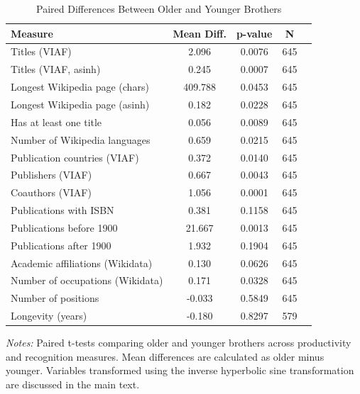 \begin{table}[H]
\centering
\caption{Paired Differences Between Older and Younger Brothers}
\label{tab:ttests}

\begin{tablebody}
\begin{tabular}{l c c c c}
\toprule
\textbf{Measure} & \textbf{Mean Diff.} & \textbf{p-value} & \textbf{N} \\
\midrule
Titles (VIAF) & 2.096 & 0.0076 & 645 \\
Titles (VIAF, asinh) & 0.245 & 0.0007 & 645 \\
Longest Wikipedia page (chars) & 409.788 & 0.0453 & 645 \\
Longest Wikipedia page (asinh) & 0.182 & 0.0228 & 645 \\
Has at least one title & 0.056  & 0.0089 & 645 \\
Number of Wikipedia languages & 0.659 &  0.0215 & 645 \\
Publication countries (VIAF) & 0.372 &  0.0140 & 645 \\
Publishers (VIAF) & 0.667 & 0.0043 & 645 \\
Coauthors (VIAF) & 1.056 & 0.0001 & 645 \\
Publications with ISBN & 0.381 & 0.1158 & 645 \\
Publications before 1900 & 21.667  & 0.0013 & 645 \\
Publications after 1900 & 1.932  & 0.1904 & 645 \\
Academic affiliations (Wikidata) & 0.130  & 0.0626 & 645 \\
Number of occupations (Wikidata) & 0.171  & 0.0328 & 645 \\
Number of positions & -0.033  & 0.5849 & 645 \\
Longevity (years) & -0.180  & 0.8297 & 579 \\
\bottomrule
\end{tabular}
\end{tablebody}

\vspace{4pt}
\begin{minipage}{\textwidth}
\footnotesize
\textit{Notes:} Paired t-tests comparing older and younger brothers across productivity and recognition measures. Mean differences are calculated as older minus younger. Variables transformed using the inverse hyperbolic sine transformation are discussed in the main text.
\end{minipage}

\end{table}